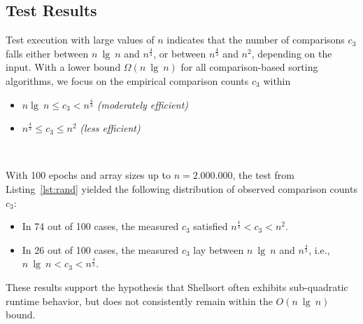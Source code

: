 \subsection{Test Results}

Test execution with large values of $n$ indicates that the number of comparisons $c_3$ falls either between $n\ \lg\ n$ and $n^{\frac{4}{3}}$, or between $n^{\frac{4}{3}}$ and $n^2$, depending on the input.
With a lower bound $\Omega(n\ \lg\ n)$ for all comparison-based sorting algorithms, we focus on the empirical comparison counts $c_3$ within

\begin{itemize}
    \item $n \lg\ n \leq c_3 < n^{\frac{4}{3}}$ \textit{(moderately efficient)}
    \item $n^{\frac{4}{3}} \leq c_3 \leq n^2$ \textit{(less efficient)}
\end{itemize}\\
\vspace{2mm}

\noindent
With 100 epochs and array sizes up to $n = 2.000.000$, the test from Listing~\ref{lst:rand} yielded the following distribution of observed comparison counts $c_3$:

\begin{itemize}
    \item In 74 out of 100 cases, the measured $c_3$ satisfied $n^{\frac{4}{3}} < c_3 < n^2$.
    \item In 26 out of 100 cases, the measured $c_3$ lay between $n\ \lg\ n$ and $n^{\frac{4}{3}}$, i.e., $n\ \lg\ n < c_3 < n^{\frac{4}{3}}$.
\end{itemize}

\noindent
These results support the hypothesis that Shellsort often exhibits sub-quadratic runtime behavior, but does not consistently remain within the $O(n\ \lg\ n)$ bound.



